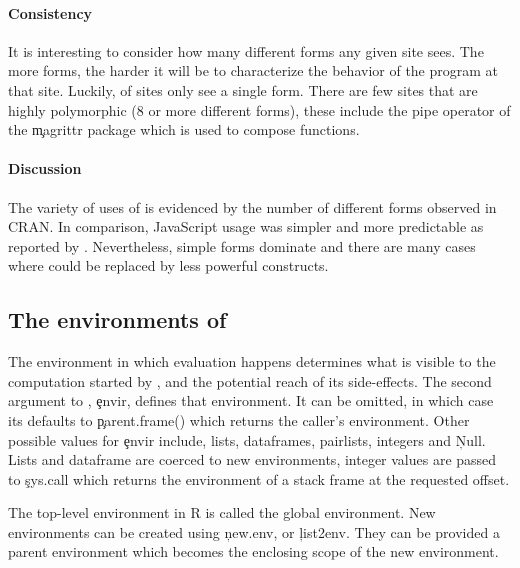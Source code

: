 \documentclass[screen,acmsmall]{acmart}
\begin{document}
\paragraph{Consistency} It is interesting to consider how many different
forms any given site sees. The more forms, the harder it will be to characterize
the behavior of the program at that site. Luckily, \packageNbOneMinimizedPercent
of sites only see a single form. There are few sites that are highly polymorphic
(8 or more different forms), these include the pipe operator of the \c{magrittr}
package which is used to compose functions.

\paragraph{Discussion} The variety of uses of \eval is evidenced by the number
of different forms observed in CRAN. In comparison, JavaScript \eval usage was
simpler and more predictable as reported by \citet{oopsla12b}. Nevertheless,
simple forms dominate and there are many cases where \eval could be replaced
by less powerful constructs.


\newpage

\subsection{The environments of \eval}

The environment in which evaluation happens determines what is visible to the
computation started by \eval, and the potential reach of its side-effects. The
second argument to \eval, \c{envir}, defines that environment. It can be
omitted, in which case its defaults to \c{parent.frame()} which returns the
caller's environment. Other possible values for \c{envir} include, lists,
dataframes, pairlists, integers and \c{Null}. Lists and dataframe are coerced to
new environments, integer values are passed to \c{sys.call} which returns the
environment of a stack frame at the requested offset.



The top-level environment in R is called the global environment. New
environments can be created using \c{new.env}, or \c{list2env}. They can be
provided a parent environment which becomes the enclosing scope of the new
environment.
\end{document}
